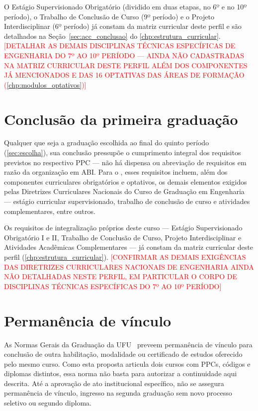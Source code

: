 O Estágio Supervisionado Obrigatório (dividido em duas etapas, no 6º e no 10º período), o Trabalho de Conclusão de Curso (9º período) e o Projeto Interdisciplinar (6º período) já constam da matriz curricular deste perfil e são detalhados na Seção~\ref{sec:acc_conclusao} do \autoref{chp:estrutura_curricular}. \textcolor{red}{[DETALHAR AS DEMAIS DISCIPLINAS TÉCNICAS ESPECÍFICAS DE ENGENHARIA DO 7º AO 10º PERÍODO — AINDA NÃO CADASTRADAS NA MATRIZ CURRICULAR DESTE PERFIL ALÉM DOS COMPONENTES JÁ MENCIONADOS E DAS 16 OPTATIVAS DAS ÁREAS DE FORMAÇÃO (\autoref{chp:modulos_optativos})]}

\section{Conclusão da primeira graduação}
\label{sec:conclusao_primeira}

Qualquer que seja a graduação escolhida ao final do quinto período (\autoref{sec:escolha}), sua conclusão pressupõe o cumprimento integral dos requisitos previstos no respectivo PPC — não há dispensa ou abreviação de requisitos em razão da organização em ABI. Para o \ppccurso, esses requisitos incluem, além dos componentes curriculares obrigatórios e optativos, os demais elementos exigidos pelas Diretrizes Curriculares Nacionais do Curso de Graduação em Engenharia~\cite{cne_ces_2_2019,cne_ces_1_2021} — estágio curricular supervisionado, trabalho de conclusão de curso e atividades complementares, entre outros.

Os requisitos de integralização próprios deste curso — Estágio Supervisionado Obrigatório I e II, Trabalho de Conclusão de Curso, Projeto Interdisciplinar e Atividades Acadêmicas Complementares — já constam da matriz curricular deste perfil (\autoref{chp:estrutura_curricular}). \textcolor{red}{[CONFIRMAR AS DEMAIS EXIGÊNCIAS DAS DIRETRIZES CURRICULARES NACIONAIS DE ENGENHARIA AINDA NÃO DETALHADAS NESTE PERFIL, EM PARTICULAR O CORPO DE DISCIPLINAS TÉCNICAS ESPECÍFICAS DO 7º AO 10º PERÍODO]}

\section{Permanência de vínculo}
\label{sec:permanencia}

As Normas Gerais da Graduação da UFU~\cite{ufu_congrad_46_2022} preveem permanência de vínculo para conclusão de outra habilitação, modalidade ou certificado de estudos oferecido pelo mesmo curso. Como esta proposta articula dois cursos com PPCs, códigos e diplomas distintos, essa norma não basta para autorizar a continuidade aqui descrita. Até a aprovação de ato institucional específico, não se assegura permanência de vínculo, ingresso na segunda graduação sem novo processo seletivo ou segundo diploma.

